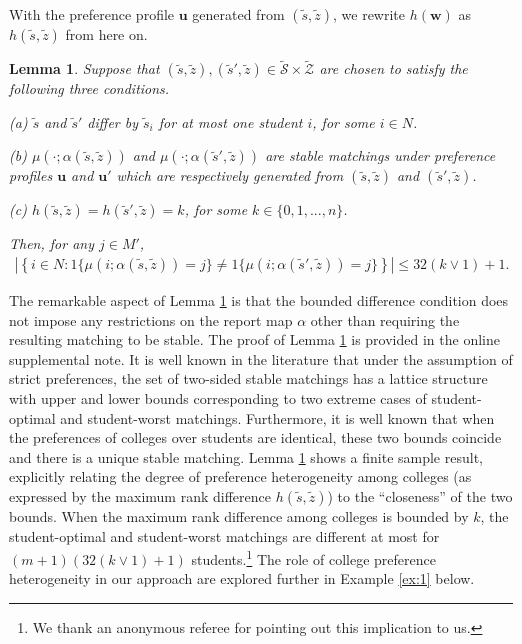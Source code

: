 \documentclass[12pt, fullpage]{amsart}
\newtheorem{lemma}{Lemma}[section]
\theoremstyle{definition}
\theoremstyle{definition}
\theoremstyle{definition}
\begin{document}
\begin{bibunit}[econometrica]
With the preference profile $\boldsymbol{u}$ generated from $(\tilde s,\tilde z)$, we rewrite $h(\boldsymbol{w})$ as $h(\tilde s,\tilde z)$ from here on.

\begin{lemma}\label{lemm:bounded_difference_condition} Suppose that $(\tilde s, \tilde z),(\tilde s', \tilde z) \in \mathcal{\tilde S} \times \mathcal{\tilde Z}$ are chosen to satisfy the following three conditions.\medskip
	
	(a) $\tilde s$ and $\tilde s'$ differ by $\tilde s_i$ for at most one student $i$, for some $i \in N$.
	
	(b) $\mu(\cdot; \alpha(\tilde s,\tilde z))$ and $\mu(\cdot; \alpha(\tilde s',\tilde z))$ are stable matchings under preference profiles $\boldsymbol{u}$ and $\boldsymbol{u}'$ which are respectively generated from $(\tilde s, \tilde z)$ and $(\tilde s', \tilde z)$.
	
	(c) $h(\tilde s, \tilde z) = h(\tilde s', \tilde z)  = k$, for some $k \in \{0,1,...,n\}$.\medskip
	
Then, for any $j  \in M'$,
	\begin{align}
		\label{eq:5pt1ii2-1-1-1}
		\left|\left\{i\in N:1\{\mu(i;\alpha(\tilde s,\tilde z)) = j\} \ne  1\{\mu(i;\alpha(\tilde s',\tilde z)) = j\}\right\} \right|\leq 32(k\vee1) +1.
	\end{align}
\end{lemma}

The remarkable aspect of Lemma \ref{lemm:bounded_difference_condition} is that the bounded difference condition does not impose any restrictions on the report map $\alpha$ other than requiring the resulting matching to be stable. The proof of Lemma \ref{lemm:bounded_difference_condition} is provided in the online supplemental note. It is well known in the literature that under the assumption of strict preferences, the set of two-sided stable matchings has a lattice structure with upper and lower bounds corresponding to two extreme cases of student-optimal and student-worst matchings. Furthermore, it is well known that when the preferences of colleges over students are identical, these two bounds coincide and there is a unique stable matching. Lemma \ref{lemm:bounded_difference_condition} shows a finite sample result, explicitly relating the degree of preference heterogeneity among colleges (as expressed by the maximum rank difference $h(\tilde s,\tilde z)$) to the ``closeness'' of the two bounds. When the maximum rank difference among colleges is bounded by $k$, the student-optimal and student-worst matchings are different at most for $(m+1)(32(k \vee 1) +1)$ students.\footnote{We thank an anonymous referee for pointing out this implication to us.} The role of college preference heterogeneity in our approach are explored further in Example \ref{ex:1} below. 


\end{bibunit}
\end{document}
